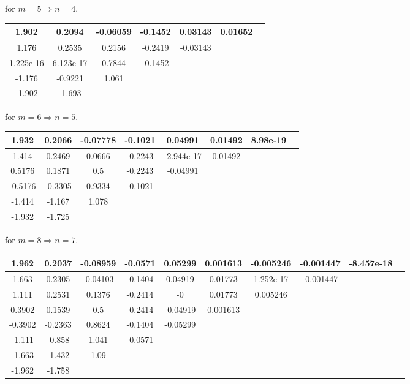 \documentclass{article}
\begin{document}
for $ m = 5 \Rightarrow n = 4 $.
\begin{center}
\begin{tabular}{|c|c|c|c|c|c|c|}
\hline
1.902 &0.2094 &-0.06059 &-0.1452 &0.03143 &0.01652\\\hline 
1.176 &0.2535 &0.2156 &-0.2419 &-0.03143 &\\\hline 
1.225e-16 &6.123e-17 &0.7844 &-0.1452 & &\\\hline 
-1.176 &-0.9221 &1.061 & & &\\\hline 
-1.902 &-1.693 & & & &\\\hline 
\end{tabular}
\end{center}

for $ m = 6 \Rightarrow n = 5 $.
\begin{center}
\begin{tabular}{|c|c|c|c|c|c|c|c|}
\hline
1.932 &0.2066 &-0.07778 &-0.1021 &0.04991 &0.01492 &8.98e-19\\\hline 
1.414 &0.2469 &0.0666 &-0.2243 &-2.944e-17 &0.01492 &\\\hline 
0.5176 &0.1871 &0.5 &-0.2243 &-0.04991 & &\\\hline 
-0.5176 &-0.3305 &0.9334 &-0.1021 & & &\\\hline 
-1.414 &-1.167 &1.078 & & & &\\\hline 
-1.932 &-1.725 & & & & &\\\hline 
\end{tabular}
\end{center}

for $ m = 8 \Rightarrow n = 7 $.
\begin{center}
\begin{tabular}{|c|c|c|c|c|c|c|c|c|c|}
\hline
1.962 &0.2037 &-0.08959 &-0.0571 &0.05299 &0.001613 &-0.005246 &-0.001447 &-8.457e-18\\\hline 
1.663 &0.2305 &-0.04103 &-0.1404 &0.04919 &0.01773 &1.252e-17 &-0.001447 &\\\hline 
1.111 &0.2531 &0.1376 &-0.2414 &-0 &0.01773 &0.005246 & &\\\hline 
0.3902 &0.1539 &0.5 &-0.2414 &-0.04919 &0.001613 & & &\\\hline 
-0.3902 &-0.2363 &0.8624 &-0.1404 &-0.05299 & & & &\\\hline 
-1.111 &-0.858 &1.041 &-0.0571 & & & & &\\\hline 
-1.663 &-1.432 &1.09 & & & & & &\\\hline 
-1.962 &-1.758 & & & & & & &\\\hline 
\end{tabular}
\end{center}
\end{document}
